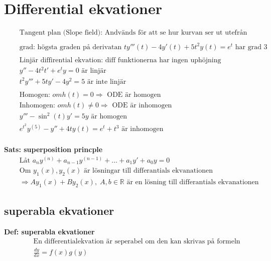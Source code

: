 \newpage


\section{Differential ekvationer}
 
\begin{align*}
  &\quad  \text{Tangent plan (Slope field):
    Andvänds för att se hur kurvan ser ut utefrån olika start värden.} \\
  &\quad  \\
  &\quad  \text{grad: högsta graden på derivatan }  t y'''(t) - 4y'(t) + 5t^2y(t) = e^t
  \text{ har grad 3} \\
  &\quad  \\
  &\quad  \text{Linjär diffirential ekvation: diff funktionerna har ingen uphöjning } \\
  &\quad  y'' - 4t^2t' + e^t y = 0 \text{ är linjär} \\
  &\quad  t^2 y''' + 5ty' - 4y^2 = 5 \text{ är inte linjär} \\
  &\quad  \\
  &\quad  \text{Homogen: } om h(t)=0 \Rightarrow \text{ ODE är homogen} \\
  &\quad  \text{Inhomogen: } om h(t)\neq0 \Rightarrow \text{ ODE är inhomogen} \\
  &\quad  y''' - \sin^2(t)y' = 5y \text{ är homogen} \\
  &\quad  e^{t^2} y^{(5)} - y'' + 4ty(t) = e^t + t^3 \text{ är inhomogen} \\
\end{align*}


\textbf{Sats: superposition princple}
\begin{align*}
  &\quad  \text{Låt } a_{n}y^{(n)} + a_{n-1}y^{(n-1)} + \ldots + a_{1}y' + a_{0}y = 0  \\
  &\quad  \text{Om } y_1(x), y_2(x) \text{ är lösningar till differantials ekvanationen} \\
  &\quad  \Rightarrow Ay_1(x) + By_2(x), \; A,b \in \mathbb{R}
  \text{ är en lösning till differantials ekvanationen}
\end{align*}


\newpage


\subsection{superabla ekvationer}
\textbf{Def: superabla ekvationer}
\begin{align*}
  &\quad  \text{En differentialekvation är seperabel om den kan skrivas på formeln} \\
  &\quad  \frac{dy}{dx} = f(x)g(y)
\end{align*}

